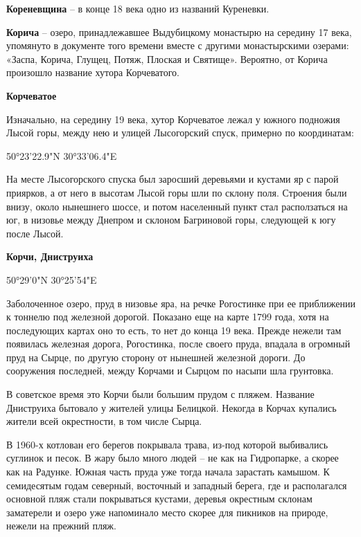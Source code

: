 \textbf{Кореневщина} – в конце 18 века одно из названий Куреневки.\\

\medskip


\textbf{Корича} – озеро, принадлежавшее Выдубицкому монастырю на середину 17 века, упомянуто в документе того времени вместе с другими монастырскими озерами: «Заспа, Корича, Глущец, Потяж, Плоская и Святище». Вероятно, от Корича произошло название хутора Корчеватого.\\

\medskip


\textbf{Корчеватое} 

Изначально, на середину 19 века, хутор Корчеватое лежал у южного подножия Лысой горы, между нею и улицей Лысогорский спуск, примерно по координатам:

50°23'22.9"N 30°33'06.4"E

На месте Лысогорского спуска был заросший деревьями и кустами яр с парой приярков, а от него в высотам Лысой горы шли по склону поля. Строения были внизу, около нынешнего 
шоссе, и потом населенный пункт стал расползаться на юг, в низовье между Днепром и склоном Багриновой горы, следующей к югу после Лысой.\\

\medskip

\textbf{Корчи, Дниструиха}

50°29'0"N 30°25'54"E

Заболоченное озеро, пруд в низовье яра, на речке Рогостинке при ее приближении к тоннелю под железной дорогой. Показано еще на карте 1799 года, хотя на последующих картах оно то есть, то нет до конца 19 века. Прежде нежели там появилась железная дорога, Рогостинка, после своего пруда, впадала в огромный пруд на Сырце, по другую сторону от нынешней железной дороги. До сооружения последней, между Корчами и Сырцом по насыпи шла грунтовка.

В советское время это Корчи были большим прудом с пляжем. Название Дниструиха бытовало у жителей улицы Белицкой. Некогда в Корчах купались жители всей окрестности, в том числе Сырца.

В 1960-х котлован его берегов покрывала трава, из-под которой выбивались суглинок и песок. В жару было много людей – не как на Гидропарке, а скорее как на Радунке. Южная часть пруда уже тогда начала зарастать камышом. К семидесятым годам северный, восточный и западный берега, где и располагался основной пляж стали покрываться кустами, деревья окрестным склонам заматерели и озеро уже напоминало место скорее для пикников на природе, нежели на прежний пляж.

